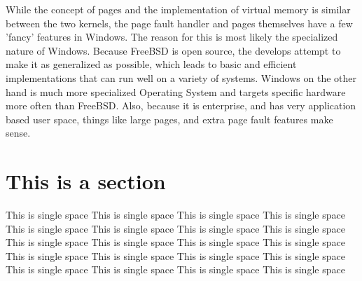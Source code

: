 \documentclass[titlepage]{article}
\begin{document}
\begin{singlespace}
While the concept of pages and the implementation of virtual memory is similar between the two kernels, the page fault handler and pages themselves have a few 'fancy' features in Windows. The reason for this is most likely the specialized nature of Windows. Because FreeBSD is open source, the develops attempt to make it as generalized as possible, which leads to basic and efficient implementations that can run well on a variety of systems. Windows on the other hand is much more specialized Operating System and targets specific hardware more often than FreeBSD. Also, because it is enterprise, and has very application based user space, things like large pages, and extra page fault features make sense.\\ 

\end{singlespace}

\section{This is a section}
\begin{singlespace}
This is single space This is single space This is single space This is single space This is single space This is single space This is single space This is single space  This is single space This is single space This is single space This is single space  This is single space This is single space This is single space This is single space  This is single space This is single space This is single space This is single space  
\end{singlespace}

\newpage


\end{document}
